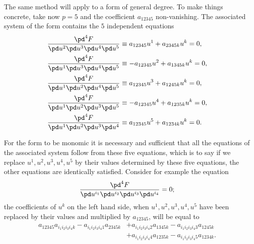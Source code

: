 \vspace{12pt}\fsec \label{fsec:10} The same method will apply to a form of general degree. To make things concrete, take now $p=5$ and the coefficient $a_{12345}$  non-vanishing. The associated system of the form contains the $5$ independent equations
\begin{align*}
  \frac{\pd^{4}F}{\pd u^{2}\pd u^{3}\pd u^{4}\pd u^{5}}&\equiv a_{12345}u^{1}+a_{2345k}u^{k}=0,\\
  \frac{\pd^{4}F}{\pd u^{1}\pd u^{3}\pd u^{4}\pd u^{5}}&\equiv -a_{12345}u^{2}+a_{1345k}u^{k}=0,\\
  \frac{\pd^{4}F}{\pd u^{1}\pd u^{2}\pd u^{4}\pd u^{5}}&\equiv a_{12345}u^{3}+a_{1245k}u^{k}=0,\\
  \frac{\pd^{4}F}{\pd u^{1}\pd u^{2}\pd u^{3}\pd u^{5}}&\equiv -a_{12345}u^{4}+a_{1235k}u^{k}=0,\\
  \frac{\pd^{4}F}{\pd u^{1}\pd u^{2}\pd u^{3}\pd u^{4}}&\equiv a_{12345}u^{5}+a_{1234k}u^{k}=0.
\end{align*}

For the form to be monomic it is necessary and sufficient that all the equations of the associated system follow from these five equations, which is to say if we replace $u^{1},u^{2},u^{3},u^{4},u^{5}$ by their values determined by these five equations, the other equations are identically satisfied. Consider for example the equation
\[
\frac{\pd ^{4} F}{\pd u^{i_{1}}\pd u^{i_{2}}\pd u^{i_{3}}\pd u^{i_{4}}}=0;
\]
the coefficients of $u^{k}$ on the left hand side, when $u^{1},u^{2},u^{3},u^{4},u^{5}$ have been replaced by their values and  multiplied by $a_{12345}$, will be equal to
\begin{align*}
a_{12345}a_{i_{1}i_{2}i_{3}i_{4}k}-a_{i_{1}i_{2}i_{3}i_{4}1}a_{2345k}&+a_{i_{1}i_{2}i_{3}i_{4}2}a_{1345k}-a_{i_{1}i_{2}i_{3}i_{4}3}a_{1245k}\\
&+a_{i_{1}i_{2}i_{3}i_{4}4}a_{1235k}-a_{i_{1}i_{2}i_{3}i_{4}5}a_{1234k}.
\end{align*}

